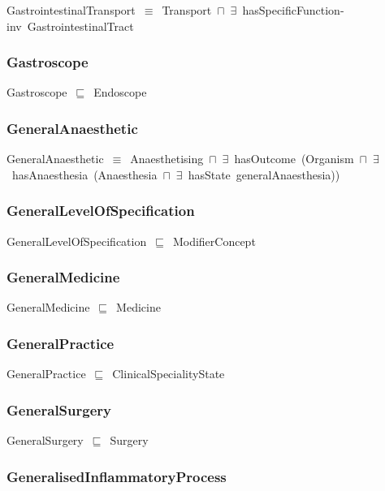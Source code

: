 \documentclass{article}
\begin{document}
GastrointestinalTransport~\ensuremath{\equiv}~Transport~\ensuremath{\sqcap}~\ensuremath{\exists}~hasSpecificFunction-inv~GastrointestinalTract

\subsubsection*{Gastroscope}

Gastroscope~\ensuremath{\sqsubseteq}~Endoscope~

\subsubsection*{GeneralAnaesthetic}

GeneralAnaesthetic~\ensuremath{\equiv}~Anaesthetising~\ensuremath{\sqcap}~\ensuremath{\exists}~hasOutcome~(Organism~\ensuremath{\sqcap}~\ensuremath{\exists}~hasAnaesthesia~(Anaesthesia~\ensuremath{\sqcap}~\ensuremath{\exists}~hasState~generalAnaesthesia))

\subsubsection*{GeneralLevelOfSpecification}

GeneralLevelOfSpecification~\ensuremath{\sqsubseteq}~ModifierConcept~

\subsubsection*{GeneralMedicine}

GeneralMedicine~\ensuremath{\sqsubseteq}~Medicine~

\subsubsection*{GeneralPractice}

GeneralPractice~\ensuremath{\sqsubseteq}~ClinicalSpecialityState~

\subsubsection*{GeneralSurgery}

GeneralSurgery~\ensuremath{\sqsubseteq}~Surgery~

\subsubsection*{GeneralisedInflammatoryProcess}
\end{document}

